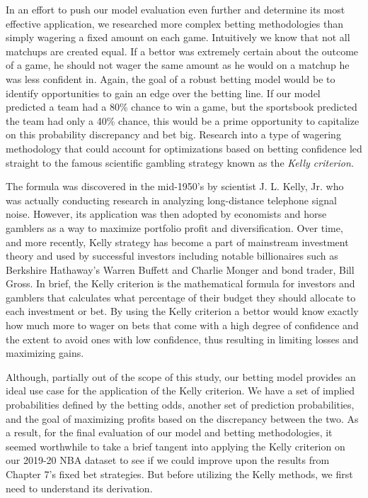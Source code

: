 \documentclass [MS] {uclathes}
\begin{document}
In an effort to push our model evaluation even further and determine its most effective application, we researched more complex betting methodologies than simply wagering a fixed amount on each game. Intuitively we know that not all matchups are created equal. If a bettor was extremely certain about the outcome of a game, he should not wager the same amount as he would on a matchup he was less confident in. Again, the goal of a robust betting model would be to identify opportunities to gain an edge over the betting line. If our model predicted a team had a 80\% chance to win a game, but the sportsbook predicted the team had only a 40\% chance, this would be a prime opportunity to capitalize on this probability discrepancy and bet big. Research into a type of wagering methodology that could account for optimizations based on betting confidence led straight to the famous scientific gambling strategy known as the \emph{Kelly criterion.}

The formula was discovered in the mid-1950's by scientist J. L. Kelly, Jr. who was actually conducting research in analyzing long-distance telephone signal noise. However, its application was then adopted by economists and horse gamblers as a way to maximize portfolio profit and diversification. Over time, and more recently, Kelly strategy has become a part of mainstream investment theory and used by successful investors including notable billionaires such as Berkshire Hathaway's Warren Buffett and Charlie Monger and bond trader, Bill Gross. In brief, the Kelly criterion is the mathematical formula for investors and gamblers that calculates what percentage of their budget they should allocate to each investment or bet. \cite{kelly} By using the Kelly criterion a bettor would know exactly how much more to wager on bets that come with a high degree of confidence and the extent to avoid ones with low confidence, thus resulting in limiting losses and maximizing gains.

Although, partially out of the scope of this study, our betting model provides an ideal use case for the application of the Kelly criterion. We have a set of implied probabilities defined by the betting odds, another set of prediction probabilities, and the goal of maximizing profits based on the discrepancy between the two. As a result, for the final evaluation of our model and betting methodologies, it seemed worthwhile to take a brief tangent into applying the Kelly criterion on our 2019-20 NBA dataset to see if we could improve upon the results from Chapter 7's fixed bet strategies. But before utilizing the Kelly methods, we first need to understand its derivation.
\end{document}
